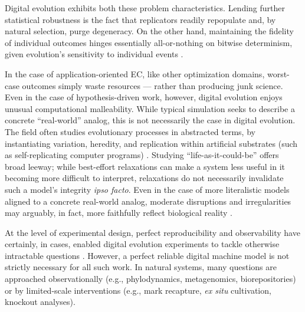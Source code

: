 Digital evolution exhibits both these problem characteristics.
Lending further statistical robustness is the fact that replicators readily repopulate \cite{lyu2021improving,lyu2023online} and, by natural selection, purge degeneracy.
On the other hand, maintaining the fidelity of individual outcomes hinges essentially all-or-nothing on bitwise determinism, given evolution's sensitivity to individual events \cite{ferguson2023potentiating}.

In the case of application-oriented EC, like other optimization domains, worst-case outcomes simply waste resources --- rather than producing junk science.
Even in the case of hypothesis-driven work, however, digital evolution enjoys unusual computational malleability.
While typical simulation seeks to describe a concrete ``real-world'' analog, this is not necessarily the case in digital evolution.
The field often studies evolutionary processes in abstracted terms, by instantiating variation, heredity, and replication within artificial substrates (such as self-replicating computer programs) \cite{pennock2007models,bonabeau1994we}.
Studying ``life-as-it-could-be'' offers broad leeway;
while best-effort relaxations can make a system less useful in it becoming more difficult to interpret, relaxations do not necessarily invalidate such a model's integrity \textit{ipso facto}.
Even in the case of more literalistic models aligned to a concrete real-world analog, moderate disruptions and irregularities may arguably, in fact, more faithfully reflect biological reality \cite{huberman1993evolutionary}.


At the level of experimental design, perfect reproducibility and observability have certainly, in cases, enabled digital evolution experiments to tackle otherwise intractable questions \cite{pontes2020evolutionary,lenski2003evolutionary,grabowski2013case,dolson2020interpreting,fortuna2019coevolutionary,goldsby2014evolutionary,covert2013experiments,zaman2011rapid,bundy2021footprint,dolson2017spatial}.
However, a perfect reliable digital machine model is not strictly necessary for all such work.
In natural systems, many questions are approached observationally (e.g., phylodynamics, metagenomics, biorepositories) or by limited-scale interventions (e.g., mark recapture, \textit{ex situ} cultivation, knockout analyses).

